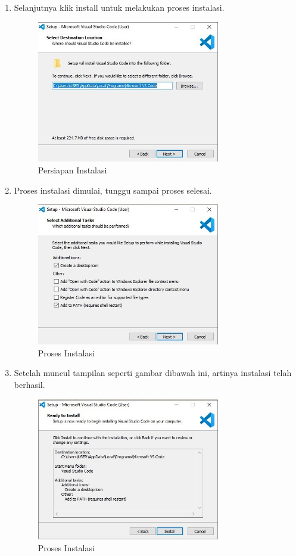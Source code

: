 \begin{enumerate}
\item Selanjutnya klik install untuk melakukan proses instalasi.
	\begin{figure}[H]
		\includegraphics[width=8cm]{figures/instalasi/vsc3.jpg}
		\centering
		\caption{Persiapan Instalasi}
	\end{figure}
	
\item Proses instalasi dimulai, tunggu sampai proses selesai.
	\begin{figure}[H]
		\includegraphics[width=8cm]{figures/instalasi/vsc4.jpg}
		\centering
		\caption{Proses Instalasi}
	\end{figure}
	
\item Setelah muncul tampilan seperti gambar dibawah ini, artinya instalasi telah berhasil.
	\begin{figure}[H]
		\includegraphics[width=8cm]{figures/instalasi/vsc5.jpg}
		\centering
		\caption{Proses Instalasi}
	\end{figure}
	

\end{enumerate}
